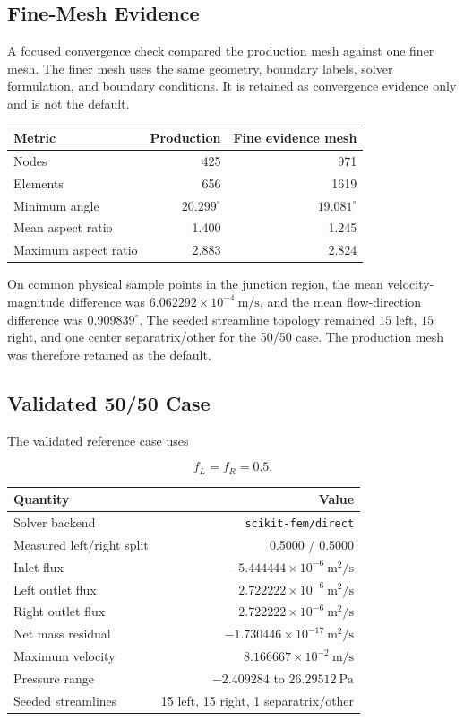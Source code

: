 \subsection{Fine-Mesh Evidence}

A focused convergence check compared the production mesh against one finer mesh.
The finer mesh uses the same geometry, boundary labels, solver formulation, and
boundary conditions. It is retained as convergence evidence only and is not the
default.

\begin{center}
\begin{tabular}{@{}lrr@{}}
\toprule
Metric & Production & Fine evidence mesh \\
\midrule
Nodes & 425 & 971 \\
Elements & 656 & 1619 \\
Minimum angle & \(20.299^\circ\) & \(19.081^\circ\) \\
Mean aspect ratio & 1.400 & 1.245 \\
Maximum aspect ratio & 2.883 & 2.824 \\
\bottomrule
\end{tabular}
\end{center}

On common physical sample points in the junction region, the mean
velocity-magnitude difference was \(6.062292\times 10^{-4}~\mathrm{m/s}\), and
the mean flow-direction difference was \(0.909839^\circ\). The seeded streamline
topology remained \(15\) left, \(15\) right, and one center separatrix/other for
the 50/50 case. The production mesh was therefore retained as the default.

\subsection{Validated 50/50 Case}

The validated reference case uses

\[
  f_L = f_R = 0.5.
\]

\begin{center}
\begin{tabular}{@{}lr@{}}
\toprule
Quantity & Value \\
\midrule
Solver backend & \texttt{scikit-fem/direct} \\
Measured left/right split & 0.5000 / 0.5000 \\
Inlet flux & \(-5.444444\times10^{-6}~\mathrm{m^2/s}\) \\
Left outlet flux & \(2.722222\times10^{-6}~\mathrm{m^2/s}\) \\
Right outlet flux & \(2.722222\times10^{-6}~\mathrm{m^2/s}\) \\
Net mass residual & \(-1.730446\times10^{-17}~\mathrm{m^2/s}\) \\
Maximum velocity & \(8.166667\times10^{-2}~\mathrm{m/s}\) \\
Pressure range & \(-2.409284\) to \(26.29512~\mathrm{Pa}\) \\
Seeded streamlines & 15 left, 15 right, 1 separatrix/other \\
\bottomrule
\end{tabular}
\end{center}

